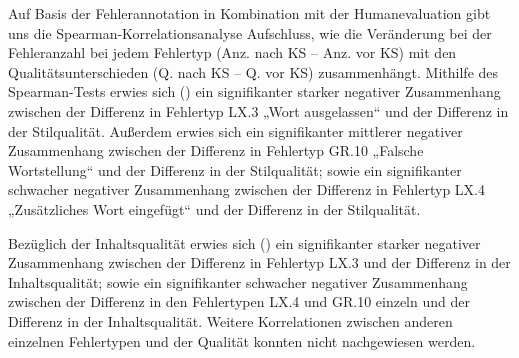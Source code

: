 
Auf Basis der Fehlerannotation in Kombination mit der Humanevaluation gibt uns die Spearman-Korrelationsanalyse Aufschluss, wie die Veränderung bei der Fehleranzahl bei jedem Fehlertyp (Anz. nach KS $–$ Anz. vor KS) mit den Qualitätsunterschieden (Q. nach KS $–$ Q. vor KS) zusammenhängt. Mithilfe des Spearman-Tests erwies sich () ein signifikanter starker negativer Zusammenhang zwischen der Differenz in Fehlertyp LX.3 „Wort ausgelassen“ und der Differenz in der Stilqualität. Außerdem erwies sich ein signifikanter mittlerer negativer Zusammenhang zwischen der Differenz in Fehlertyp GR.10 „Falsche Wortstellung“ und der Differenz in der Stilqualität; sowie ein signifikanter schwacher negativer Zusammenhang zwischen der Differenz in Fehlertyp LX.4 „Zusätzliches Wort eingefügt“ und der Differenz in der Stilqualität.

Bezüglich der Inhaltsqualität erwies sich () ein signifikanter starker negativer Zusammenhang zwischen der Differenz in Fehlertyp LX.3 und der Differenz in der Inhaltsqualität; sowie ein signifikanter schwacher negativer Zusammenhang zwischen der Differenz in den Fehlertypen LX.4 und GR.10 einzeln und der Differenz in der Inhaltsqualität. Weitere Korrelationen zwischen anderen einzelnen Fehlertypen und der Qualität konnten nicht nachgewiesen werden.


